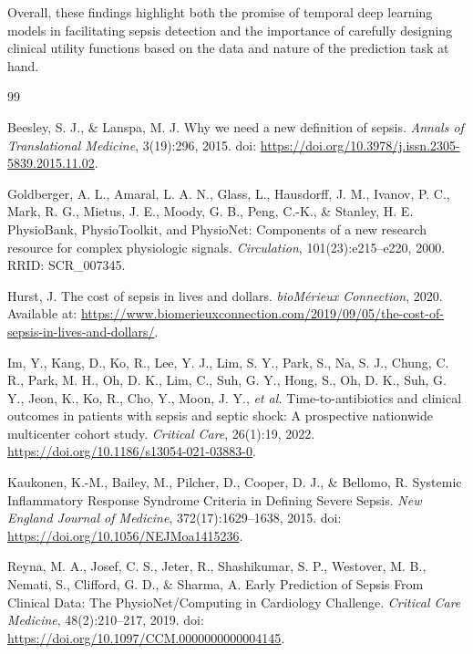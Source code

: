 \documentclass{article}
\theoremstyle{plain}
\theoremstyle{definition}
\theoremstyle{remark}
\begin{document}
Overall, these findings highlight both the promise of temporal deep learning models in facilitating sepsis detection and the importance of carefully designing clinical utility functions based on the data and nature of the prediction task at hand.  


\begin{thebibliography}{99}

Beesley, S. J., \& Lanspa, M. J.
\newblock Why we need a new definition of sepsis.
\newblock \emph{Annals of Translational Medicine}, 3(19):296, 2015.
\newblock doi: \url{https://doi.org/10.3978/j.issn.2305-5839.2015.11.02}.

Goldberger, A. L., Amaral, L. A. N., Glass, L., Hausdorff, J. M., Ivanov, P. C., Mark, R. G., Mietus, J. E., Moody, G. B., Peng, C.-K., \& Stanley, H. E.
\newblock PhysioBank, PhysioToolkit, and PhysioNet: Components of a new research resource for complex physiologic signals.
\newblock \emph{Circulation}, 101(23):e215--e220, 2000.
\newblock RRID: SCR\_007345.

Hurst, J.
\newblock The cost of sepsis in lives and dollars.
\newblock \emph{bioM{\'e}rieux Connection}, 2020.
\newblock Available at: \url{https://www.biomerieuxconnection.com/2019/09/05/the-cost-of-sepsis-in-lives-and-dollars/}.

Im, Y., Kang, D., Ko, R., Lee, Y. J., Lim, S. Y., Park, S., Na, S. J., Chung, C. R., Park, M. H., Oh, D. K., Lim, C., Suh, G. Y., Hong, S., Oh, D. K., Suh, G. Y., Jeon, K., Ko, R., Cho, Y., Moon, J. Y., \emph{et al.}
\newblock Time-to-antibiotics and clinical outcomes in patients with sepsis and septic shock: A prospective nationwide multicenter cohort study.
\newblock \emph{Critical Care}, 26(1):19, 2022.
\newblock \url{https://doi.org/10.1186/s13054-021-03883-0}.

Kaukonen, K.-M., Bailey, M., Pilcher, D., Cooper, D. J., \& Bellomo, R.
\newblock Systemic Inflammatory Response Syndrome Criteria in Defining Severe Sepsis.
\newblock \emph{New England Journal of Medicine}, 372(17):1629--1638, 2015.
\newblock doi: \url{https://doi.org/10.1056/NEJMoa1415236}.

Reyna, M. A., Josef, C. S., Jeter, R., Shashikumar, S. P., Westover, M. B., Nemati, S., Clifford, G. D., \& Sharma, A.
\newblock Early Prediction of Sepsis From Clinical Data: The PhysioNet/Computing in Cardiology Challenge.
\newblock \emph{Critical Care Medicine}, 48(2):210--217, 2019.
\newblock doi: \url{https://doi.org/10.1097/CCM.0000000000004145}.


\end{thebibliography}
\end{document}
